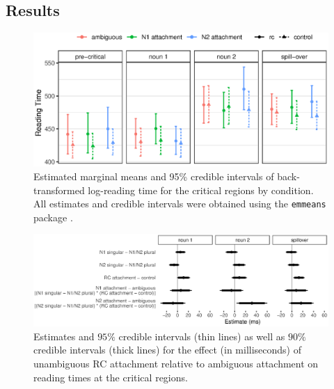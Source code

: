 \documentclass[english, doc]{apa7}\usepackage[]{graphicx}\usepackage[]{color}
\makeatletter
\def\maxwidth{ %
  \ifdim\Gin@nat@width>\linewidth
    \linewidth
  \else
    \Gin@nat@width
  \fi
}
\makeatother
\begin{document}
\subsection{Results}


\begin{figure}
\includegraphics[width=\maxwidth]{./figure/sprEMMs.eps} 
\caption{Estimated marginal means and 95\% credible intervals of back-transformed log-reading time for the critical regions by condition. All estimates and credible intervals were obtained using the \texttt{emmeans} package 
. }
\label{fig:sprAverageRTs}
\end{figure}

\begin{figure}
\includegraphics[width=\maxwidth]{figure/sprModelPlot.eps} 
\caption{Estimates and $95\%$ credible intervals (thin lines) as well as $90\%$ credible intervals (thick lines) for the effect (in milliseconds) of unambiguous RC attachment relative to ambiguous attachment on reading times at the critical regions.}
\label{fig:sprModelPlot}
\end{figure}
\end{document}
